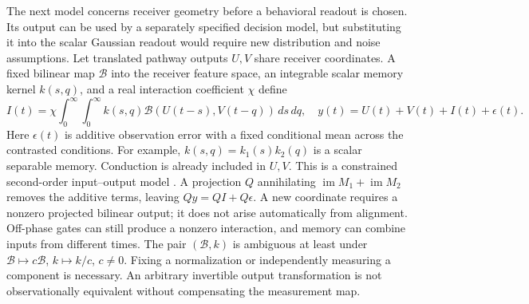 \documentclass[submission,nolinenumbers]{esj}
\newcommand{\Bmap}{\mathcal{B}}
\DeclareMathOperator{\im}{im}
\begin{document}
The next model concerns receiver geometry before a behavioral readout is chosen. Its output can be used by a separately specified decision model, but substituting it into the scalar Gaussian readout would require new distribution and noise assumptions. Let translated pathway outputs $U,V$ share receiver coordinates. A fixed bilinear map $\Bmap$ into the receiver feature space, an integrable scalar memory kernel $k(s,q)$, and a real interaction coefficient $\chi$ define
\begin{equation}
I(t)=\chi\int_0^\infty\!\int_0^\infty k(s,q)\Bmap(U(t-s),V(t-q))\,ds\,dq,
\quad y(t)=U(t)+V(t)+I(t)+\epsilon(t).\label{eq:mixed}
\end{equation}
Here $\epsilon(t)$ is additive observation error with a fixed conditional mean across the contrasted conditions. For example, $k(s,q)=k_1(s)k_2(q)$ is a scalar separable memory. Conduction is already included in $U,V$. This is a constrained second-order input--output model \citep{korenberg1996}. A projection $Q$ annihilating $\im M_1+\im M_2$ removes the additive terms, leaving $Qy=QI+Q\epsilon$. A new coordinate requires a nonzero projected bilinear output; it does not arise automatically from alignment. Off-phase gates can still produce a nonzero interaction, and memory can combine inputs from different times.
The pair $(\Bmap,k)$ is ambiguous at least under $\Bmap\mapsto c\Bmap$, $k\mapsto k/c$, $c\ne0$. Fixing a normalization or independently measuring a component is necessary. An arbitrary invertible output transformation is not observationally equivalent without compensating the measurement map.
\end{document}
